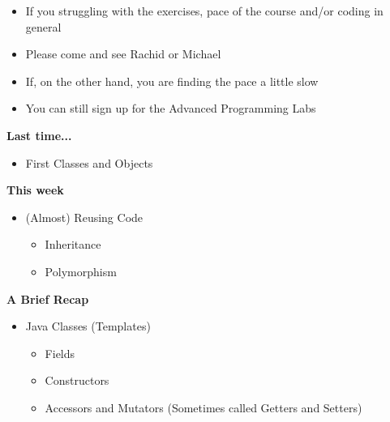 \documentclass{beamer}
\begin{document}
\begin{frame}
\begin{itemize}
\item If you struggling with the exercises, pace of the course and/or coding in general
\item Please come and see Rachid or Michael
\end{itemize}
\end{frame}
 
\begin{frame} 
\begin{itemize}
\item If, on the other hand, you are finding the pace a little slow  
\item You can still sign up for the Advanced Programming Labs
\end{itemize}
\end{frame}

\begin{frame}
\begin{center}
\textbf{Last time...}
\end{center} 
\begin{itemize}
\item First Classes and Objects
\end{itemize}
\end{frame}

\begin{frame}
\begin{center}
\textbf{This week}
\end{center} 
\begin{itemize}
\item (Almost) Reusing Code
\begin{itemize}
\item Inheritance
\item Polymorphism
\end{itemize}
\end{itemize}
\end{frame}

\begin{frame}
\begin{center}
\textbf{A Brief Recap}
\end{center}
\begin{itemize}
\item Java Classes (Templates)
\begin{itemize}
\item Fields
\item Constructors
\item Accessors and Mutators (Sometimes called Getters and Setters)

\end{itemize}
\end{itemize}
\end{frame}
\end{document}
